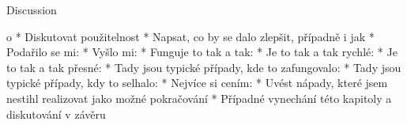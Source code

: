 \chap Discussion

		\Green
		\begitems \style o
			* Diskutovat použitelnost
			* Napsat, co by se dalo zlepšit, případně i jak
			* Podařilo se mi:
			* Vyšlo mi:
			* Funguje to tak a tak:
			* Je to tak a tak rychlé:
			* Je to tak a tak přesné:
			* Tady jsou typické případy, kde to zafungovalo:
			* Tady jsou typické případy, kdy to selhalo:
			* Nejvíce si cením:
			* Uvést nápady, které jsem nestihl realizovat jako možné pokračování
			* Případné vynechání této kapitoly a diskutování v závěru
		\enditems
		\Black
